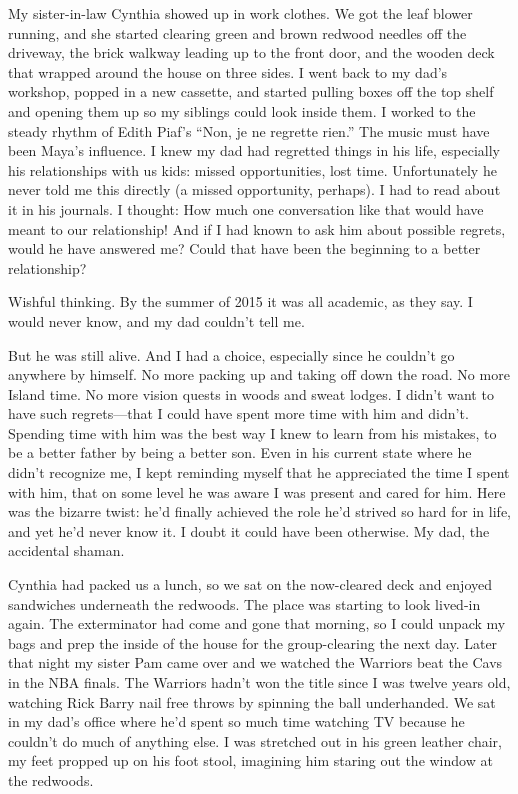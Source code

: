 \documentclass[12pt]{book}
\begin{document}
My sister-in-law Cynthia showed up in work clothes. We got the leaf blower running, and she started clearing green and brown redwood needles off the driveway, the brick walkway leading up to the front door, and the wooden deck that wrapped around the house on three sides. I went back to my dad's workshop, popped in a new cassette, and started pulling boxes off the top shelf and opening them up so my siblings could look inside them. I worked to the steady rhythm of Edith Piaf's ``Non, je ne regrette rien.'' The music must have been Maya's influence. I knew my dad had regretted things in his life, especially his relationships with us kids: missed opportunities, lost time. Unfortunately he never told me this directly (a missed opportunity, perhaps). I had to read about it in his journals. I thought: How much one conversation like that would have meant to our relationship! And if I had known to ask him about possible regrets, would he have answered me? Could that have been the beginning to a better relationship?

Wishful thinking. By the summer of 2015 it was all academic, as they say. I would never know, and my dad couldn't tell me.

But he was still alive. And I had a choice, especially since he couldn't go anywhere by himself. No more packing up and taking off down the road. No more Island time. No more vision quests in woods and sweat lodges. I didn't want to have such regrets---that I could have spent more time with him and didn't. Spending time with him was the best way I knew to learn from his mistakes, to be a better father by being a better son. Even in his current state where he didn't recognize me, I kept reminding myself that he appreciated the time I spent with him, that on some level he was aware I was present and cared for him. Here was the bizarre twist: he'd finally achieved the role he'd strived so hard for in life, and yet he'd never know it. I doubt it could have been otherwise. My dad, the accidental shaman.

Cynthia had packed us a lunch, so we sat on the now-cleared deck and enjoyed sandwiches underneath the redwoods. The place was starting to look lived-in again. The exterminator had come and gone that morning, so I could unpack my bags and prep the inside of the house for the group-clearing the next day. Later that night my sister Pam came over and we watched the Warriors beat the Cavs in the NBA finals. The Warriors hadn't won the title since I was twelve years old, watching Rick Barry nail free throws by spinning the ball underhanded. We sat in my dad's office where he'd spent so much time watching TV because he couldn't do much of anything else. I was stretched out in his green leather chair, my feet propped up on his foot stool, imagining him staring out the window at the redwoods.
\end{document}
